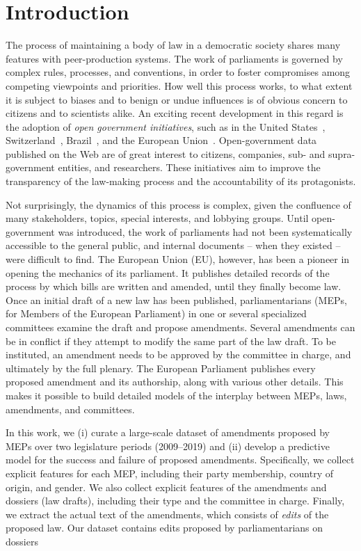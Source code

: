 \section{Introduction}
\label{lmp:sec:intro}

The process of maintaining a body of law in a democratic society shares many features with peer-production systems.
The work of parliaments is governed by complex rules, processes, and conventions, in order to foster compromises among competing viewpoints and priorities.
How well this process works, to what extent it is subject to biases and to benign or undue influences is of obvious concern to citizens and to scientists alike.
An exciting recent development in this regard is the adoption of {\em open government initiatives}, such as in the United States~\citep{open2009barack}, Switzerland~\citep{switzerland2021open}, Brazil~\citep{brazil2021dado}, and the European Union~\citep{european2021data}.
Open-government data published on the Web are of great interest to citizens, companies, sub- and supra-government entities, and researchers.
These initiatives aim to improve the transparency of the law-making process and the accountability of its protagonists.

Not surprisingly, the dynamics of this process is complex, given the confluence of many stakeholders, topics, special interests, and lobbying groups.
Until open-government was introduced, the work of parliaments had not been systematically accessible to the general public, and internal documents -- when they existed -- were difficult to find.
The European Union (EU), however, has been a pioneer in opening the mechanics of its parliament.
It publishes detailed records of the process by which bills are written and amended, until they finally become law.
Once an initial draft of a new law has been published, parliamentarians (MEPs, for Members of the European Parliament) in one or several specialized committees examine the draft and propose amendments.
Several amendments can be in conflict if they attempt to modify the same part of the law draft.
To be instituted, an amendment needs to be approved by the committee in charge, and ultimately by the full plenary.
The European Parliament publishes every proposed amendment and its authorship, along with various other details.
This makes it possible to build detailed models of the interplay between MEPs, laws, amendments, and committees.

In this work, we (i) curate a large-scale dataset of amendments proposed by MEPs over two legislature periods (2009--2019) and (ii) develop a predictive model for the success and failure of proposed amendments.
Specifically, we collect explicit features for each MEP, including their party membership, country of origin, and gender.
We also collect explicit features of the amendments and dossiers (law drafts), including  their type and the committee in charge.
Finally, we extract the actual text of the amendments, which consists of \emph{edits} of the proposed law.
Our dataset contains  edits proposed by  parliamentarians on  dossiers

